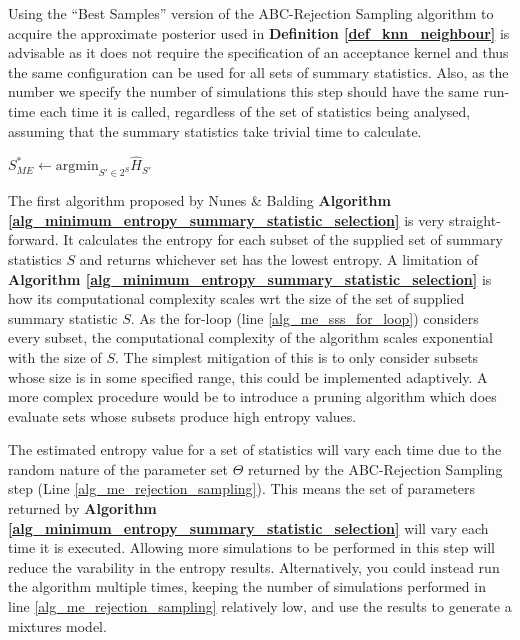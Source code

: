 \documentclass[bibliography=totoc,11pt,a4paper,margin=0]{article}
\theoremstyle{break}
\begin{document}
  \par Using the ``Best Samples'' version of the ABC-Rejection Sampling algorithm to acquire the approximate posterior used in \textbf{Definition \ref{def_knn_neighbour}} is advisable as it does not require the specification of an acceptance kernel and thus the same configuration can be used for all sets of summary statistics. Also, as the number we specify the number of simulations this step should have the same run-time each time it is called, regardless of the set of statistics being analysed, assuming that the summary statistics take trivial time to calculate.

  \begin{box_algorithm}\label{alg_minimum_entropy_summary_statistic_selection}
    \begin{algorithm}[H]
      $S_{ME}^*\leftarrow\text{argmin}_{S'\in 2^S}\hat{H}_{S'}$\\
    \end{algorithm}
  \end{box_algorithm}

  \par The first algorithm proposed by Nunes \& Balding \textbf{Algorithm \ref{alg_minimum_entropy_summary_statistic_selection}} is very straight-forward. It calculates the entropy for each subset of the supplied set of summary statistics $S$ and returns whichever set has the lowest entropy. A limitation of \textbf{Algorithm \ref{alg_minimum_entropy_summary_statistic_selection}} is how its computational complexity scales wrt the size of the set of supplied summary statistic $S$. As the for-loop (line \ref{alg_me_sss_for_loop}) considers every subset, the computational complexity of the algorithm scales exponential with the size of $S$. The simplest mitigation of this is to only consider subsets whose size is in some specified range, this could be implemented adaptively. A more complex procedure would be to introduce a pruning algorithm which does evaluate sets whose subsets produce high entropy values.

  \par The estimated entropy value for a set of statistics will vary each time due to the random nature of the parameter set $\Theta$ returned by the ABC-Rejection Sampling step (Line \ref{alg_me_rejection_sampling}). This means the set of parameters returned by \textbf{Algorithm \ref{alg_minimum_entropy_summary_statistic_selection}} will vary each time it is executed. Allowing more simulations to be performed in this step will reduce the varability in the entropy results. Alternatively, you could instead run the algorithm multiple times, keeping the number of simulations performed in line \ref{alg_me_rejection_sampling} relatively low, and use the results to generate a mixtures model.
\end{document}
